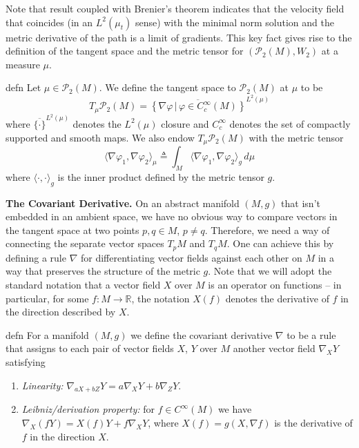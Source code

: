 \documentclass[11pt]{article}
\newcommand{\man}{M}
\begin{document}
Note that result coupled with Brenier's theorem indicates that the velocity field that coincides (in an $L^2(\mu_t)$ sense) with the minimal norm solution and the metric derivative of the path is a limit of gradients. This key fact gives rise to the definition of the tangent space and the metric tensor for $(\mathcal{P}_{2}(\man), W_2)$ at a measure $\mu$. 

\begin{restatable}{defn}{}
    Let $\mu \in \mathcal{P}_2(\man)$. We define the tangent space to $\mathcal{P}_2(\man)$ at $\mu$ to be 
    \begin{equation}
        T_\mu \mathcal{P}_2(\man) = \overline{\left\{\nabla \varphi \, | \, \varphi \in C_c^{\infty}(\man)\right\}}^{L^2(\mu)}
    \end{equation}
    where $\overline{\{\cdot \}}^{L^2(\mu)}$ denotes the $L^2(\mu)$ closure and $C_c^{\infty}$ denotes the set of compactly supported and smooth maps. We also endow $T_\mu \mathcal{P}_2(\man)$ with the metric tensor
    \begin{equation}
        \langle \nabla \varphi_1, \nabla \varphi_2\rangle_{\mu} \triangleq \int_\man \langle\nabla\varphi_1, \nabla\varphi_2 \rangle_g \,d\mu 
    \end{equation}
    where $\langle \cdot, \cdot \rangle_g$ is the inner product defined by the metric tensor $g$.
\end{restatable}

\noindent \textbf{The Covariant Derivative.} 
On an abstract manifold $(\man, g)$ that isn't embedded in an ambient space, we have no obvious way to compare vectors in the tangent space at two points $p, q \in \man$, $p \neq q$. Therefore, we need a way of connecting the separate vector spaces $T_p\man$ and $T_q\man$. One can achieve this by defining a rule $\nabla$ for differentiating vector fields against each other on $\man$ in a way that preserves the structure of the metric $g$. Note that we will adopt the standard notation that a vector field $X$ over $\man$ is an operator on functions -- in particular, for some $f: \man \rightarrow \mathbb{R}$, the notation $X(f)$ denotes the derivative of $f$ in the direction described by $X$. 

\begin{restatable}{defn}{}
    For a manifold $(\man, g)$ we define the covariant derivative $\nabla$ to be a rule that assigns to each pair of vector fields $X$, $Y$ over $\man$ another vector field $\nabla_XY$ satisfying 
    \begin{enumerate}
        \item \textit{Linearity:} $\nabla_{aX+bZ}Y = a\nabla_XY + b\nabla_ZY.$
        \item \textit{Leibniz/derivation property:} for $f \in C^{\infty}(\man)$ we have $\nabla_X(fY) = X(f)Y + f\nabla_XY$, where $X(f) = g(X, \nabla f)$ is the derivative of $f$ in the direction $X$.
    \end{enumerate}
\end{restatable}
\end{document}
